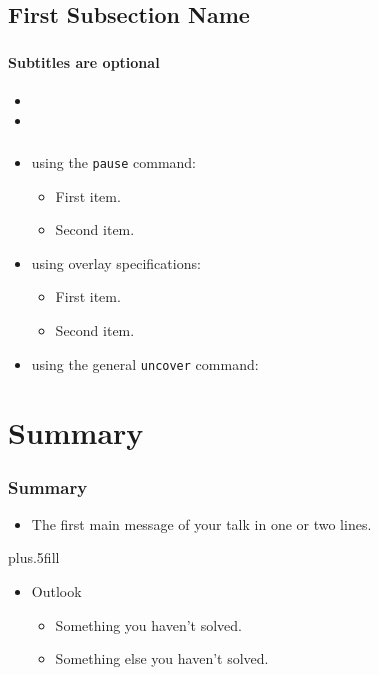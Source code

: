 \documentclass{beamer}
\begin{document}
\subsection[Short First Subsection Name]{First Subsection Name}

\begin{frame}
\frametitle{}
\framesubtitle{Subtitles are optional}

\begin{itemize}
  \item
  \item
\end{itemize}
\end{frame}

\begin{frame}
\frametitle{}

\begin{itemize}
  \item using the \texttt{pause} command:
  \begin{itemize}
    \item First item.
    \pause
    \item Second item.
  \end{itemize}
  \item using overlay specifications:
  \begin{itemize}
    \item<3-> First item.
    \item<4-> Second item.
  \end{itemize}
  \item using the general \texttt{uncover} command:
  \begin{itemize}
  \end{itemize}
\end{itemize}
\end{frame}

\section*{Summary}

\begin{frame}
\frametitle<presentation>{Summary}

\begin{itemize}
  \item The \alert{first main message} of your talk in one or two lines.
\end{itemize}

\vskip0pt plus.5fill
\begin{itemize}
  \item Outlook
  \begin{itemize}
    \item Something you haven't solved.
    \item Something else you haven't solved.
  \end{itemize}
\end{itemize}
\end{frame}
\end{document}
